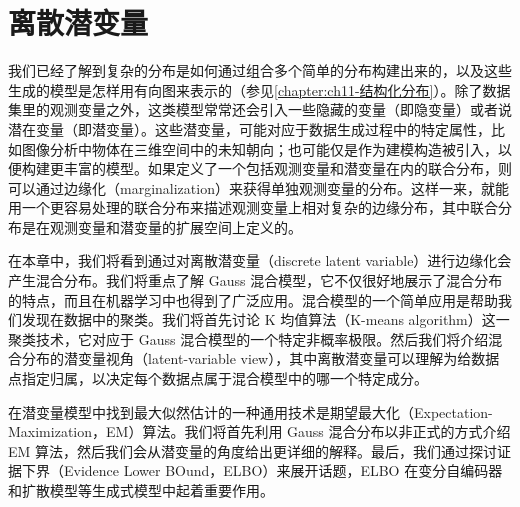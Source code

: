 \documentclass[../main.tex]{subfiles}
\begin{document}
\chapter{离散潜变量}\label{chapter:ch15-离散潜变量}

我们已经了解到复杂的分布是如何通过组合多个简单的分布构建出来的，以及这些生成的模型是怎样用有向图来表示的（参见\cref{chapter:ch11-结构化分布}）。除了数据集里的观测变量之外，这类模型常常还会引入一些隐藏的变量（即隐变量）或者说潜在变量（即潜变量）。这些潜变量，可能对应于数据生成过程中的特定属性，比如图像分析中物体在三维空间中的未知朝向；也可能仅是作为建模构造被引入，以便构建更丰富的模型。如果定义了一个包括观测变量和潜变量在内的联合分布，则可以通过边缘化（marginalization）来获得单独观测变量的分布。这样一来，就能用一个更容易处理的联合分布来描述观测变量上相对复杂的边缘分布，其中联合分布是在观测变量和潜变量的扩展空间上定义的。

在本章中，我们将看到通过对离散潜变量（discrete latent variable）进行边缘化会产生混合分布。我们将重点了解 Gauss 混合模型，它不仅很好地展示了混合分布的特点，而且在机器学习中也得到了广泛应用。混合模型的一个简单应用是帮助我们发现在数据中的聚类。我们将首先讨论 K 均值算法（K-means algorithm）这一聚类技术，它对应于 Gauss 混合模型的一个特定非概率极限。然后我们将介绍混合分布的潜变量视角（latent-variable view），其中离散潜变量可以理解为给数据点指定归属，以决定每个数据点属于混合模型中的哪一个特定成分。

在潜变量模型中找到最大似然估计的一种通用技术是期望最大化（Expectation-Maximization，EM）算法。我们将首先利用 Gauss 混合分布以非正式的方式介绍 EM 算法，然后我们会从潜变量的角度给出更详细的解释。最后，我们通过探讨证据下界（Evidence Lower BOund，ELBO）来展开话题，ELBO 在变分自编码器和扩散模型等生成式模型中起着重要作用。






\end{document}
